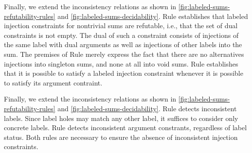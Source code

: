 
Finally, we extend the inconsistency relations as shown in \autoref{fig:labeled-sums-refutability-rules} and \autoref{fig:labeled-sums-decidability}.
Rule \RXInj establishes that labeled injection constraints for nontrivial sums are refutable, i.e., that the set of dual constraints is not empty.
The dual of such a constraint consists of injections of the same label with dual arguments as well as injections of other labels into the sum.
The premises of Rule \RXInj merely express the fact that there are no alternatives injections into singleton sums, and none at all into void sums.
Rule \PInj establishes that it is possible to satisfy a labeled injection constraint whenever it is possible to satisfy its argument contraint.


Finally, we extend the inconsistency relations as shown in \autoref{fig:labeled-sums-refutability-rules} and \autoref{fig:labeled-sums-decidability}.
Rule \CINCInjTag detects inconsistent labels.
Since label holes may match any other label, it suffices to consider only concrete labels.
Rule \CINCInjArg detects inconsistent argument constrants, regardless of label status.
Both rules are necessary to ensure the absence of inconsistent injection constraints.

